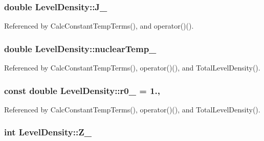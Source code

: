 \hypertarget{classLevelDensity_a20733f689cc018869ef19f2e6bcd3c87}{
\subsubsection[{J\-\_\-}]{\setlength{\rightskip}{0pt plus 5cm}double Level\-Density\-::\-J\-\_\-\hspace{0.3cm}{\ttfamily [protected]}}}\label{classLevelDensity_a20733f689cc018869ef19f2e6bcd3c87}


Referenced by Calc\-Constant\-Temp\-Terms(), and operator()().

\hypertarget{classLevelDensity_a7a97d015ef2f00caa58af1854ee492ca}{
\subsubsection[{nuclear\-Temp\-\_\-}]{\setlength{\rightskip}{0pt plus 5cm}double Level\-Density\-::nuclear\-Temp\-\_\-\hspace{0.3cm}{\ttfamily [protected]}}}\label{classLevelDensity_a7a97d015ef2f00caa58af1854ee492ca}


Referenced by Calc\-Constant\-Temp\-Terms(), operator()(), and Total\-Level\-Density().

\hypertarget{classLevelDensity_afbfc27a16a0ef3a990dce6ef5acf7863}{
\subsubsection[{r0\-\_\-}]{\setlength{\rightskip}{0pt plus 5cm}const double Level\-Density\-::r0\-\_\- = 1.\hspace{0.3cm}{\ttfamily [static]}, {\ttfamily [protected]}}}\label{classLevelDensity_afbfc27a16a0ef3a990dce6ef5acf7863}


Referenced by Calc\-Constant\-Temp\-Terms(), operator()(), and Total\-Level\-Density().

\hypertarget{classLevelDensity_a4e3c2f3637a11130dc5d0504bf0af9c9}{
\subsubsection[{Z\-\_\-}]{\setlength{\rightskip}{0pt plus 5cm}int Level\-Density\-::\-Z\-\_\-\hspace{0.3cm}{\ttfamily [protected]}}}\label{classLevelDensity_a4e3c2f3637a11130dc5d0504bf0af9c9}


